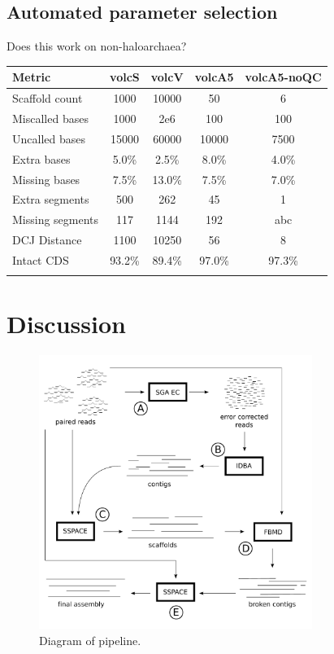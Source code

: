 \documentclass{bioinfo}
\begin{document}
\subsection{Automated parameter selection}

Does this work on non-haloarchaea?


\begin{table}[!t]
{\begin{tabular}{l|cccc}\toprule
Metric & volcS & volcV & volcA5 & volcA5-noQC\\\midrule
Scaffold count & 1000 & 10000 & 50  & 6 \\
Miscalled bases & 1000 & 2e6 & 100 & 100 \\
Uncalled bases & 15000 & 60000 & 10000 & 7500 \\
Extra bases & 5.0\% & 2.5\% & 8.0\% & 4.0\% \\
Missing bases & 7.5\% & 13.0\% & 7.5\% & 7.0\% \\
Extra segments & 500 & 262 & 45 & 1 \\
Missing segments & 117 & 1144 & 192 & abc \\
DCJ Distance & 1100 & 10250 & 56 & 8 \\
Intact CDS & 93.2\% & 89.4\% & 97.0\% & 97.3\% \\
\botrule \\
\end{tabular}}{}
\end{table}



\section{Discussion}


\begin{figure}[t]
\includegraphics[width=3.5in]{a5pipeline-diagram.pdf}
\vspace{-1cm}
\caption{Diagram of pipeline. }\label{fig:01}
\end{figure}
\end{document}
